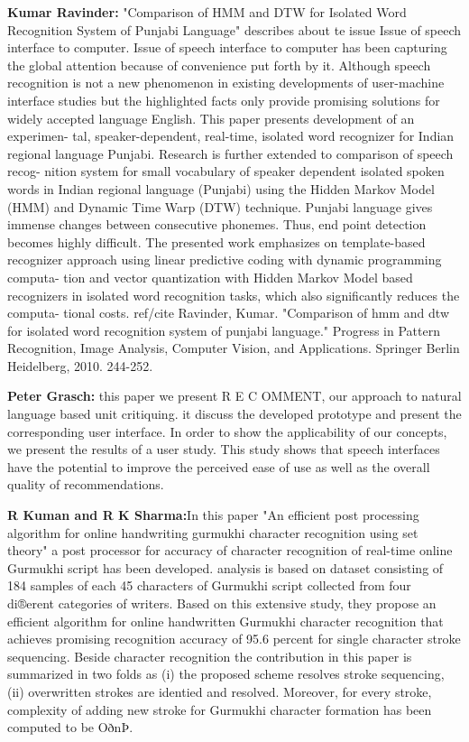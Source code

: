 \documentclass[12pt,a4paper,oldfontcommands]{memoir}
\begin{document}
\textbf{Kumar Ravinder:} "Comparison of HMM and DTW for Isolated Word Recognition System of Punjabi Language" describes about te issue Issue of speech interface to computer.
Issue of speech interface to computer has been capturing the global
attention because of convenience put forth by it. Although speech recognition is
not a new phenomenon in existing developments of user-machine interface
studies but the highlighted facts only provide promising solutions for widely
accepted language English. This paper presents development of an experimen-
tal, speaker-dependent, real-time, isolated word recognizer for Indian regional
language Punjabi. Research is further extended to comparison of speech recog-
nition system for small vocabulary of speaker dependent isolated spoken words
in Indian regional language (Punjabi) using the Hidden Markov Model (HMM)
and Dynamic Time Warp (DTW) technique. Punjabi language gives immense
changes between consecutive phonemes. Thus, end point detection becomes
highly difficult. The presented work emphasizes on template-based recognizer
approach using linear predictive coding with dynamic programming computa-
tion and vector quantization with Hidden Markov Model based recognizers in
isolated word recognition tasks, which also significantly reduces the computa-
tional costs. ref/cite Ravinder, Kumar. "Comparison of hmm and dtw for isolated word recognition system of punjabi language." Progress in Pattern Recognition, Image Analysis, Computer Vision, and Applications. Springer Berlin Heidelberg, 2010. 244-252.

\textbf{Peter Grasch:} this paper we present R E C OMMENT, our
approach to natural language based unit critiquing. it discuss the
developed prototype and present the corresponding user interface.
In order to show the applicability of our concepts, we present the
results of a user study. This study shows that speech interfaces
have the potential to improve the perceived ease of use as well as
the overall quality of recommendations.  

\textbf{R Kuman and R K Sharma:}In this paper "An efficient post processing algorithm for online handwriting gurmukhi character recognition using set theory" a post processor for accuracy of character recognition of real-time online Gurmukhi script has been developed.  analysis is based on dataset consisting of 184 samples of
each 45 characters of Gurmukhi script collected from four di®erent categories of writers. Based
on this extensive study, they  propose an efficient  algorithm for online handwritten Gurmukhi
character recognition that achieves promising recognition accuracy of 95.6 percent for single character
stroke sequencing. Beside character recognition the contribution in this paper is summarized
in two folds as (i) the proposed scheme resolves stroke sequencing, (ii) overwritten strokes
are identied and resolved. Moreover, for every stroke, complexity of adding new stroke for
Gurmukhi character formation has been computed to be OðnÞ.  
\end{document}
